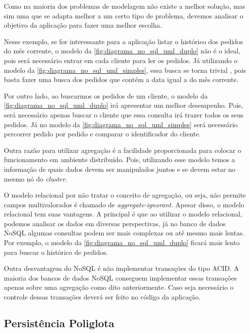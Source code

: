 Como na maioria dos problemas de modelagem não existe a melhor solução, mas sim uma que se adapta melhor a um certo tipo de problema, devemos analisar o objetivo da aplicação para fazer uma melhor escolha.

Nesse exemplo, se for interessante para a aplicação listar o histórico dos pedidos do mês corrente, o modelo da \autoref{fig:diagrama_no_sql_uml_duplo} não é o ideal, pois será necessário entrar em cada cliente para ler os pedidos. Já utilizando o modelo da \autoref{fig:diagrama_no_sql_uml_simples}, essa busca se torna trivial \cite{NoSQL}, pois basta fazer uma busca dos pedidos que contém a data igual a do mês corrente.

Por outro lado, ao buscarmos os pedidos de um cliente, o modelo da \autoref{fig:diagrama_no_sql_uml_duplo} irá apresentar um melhor desempenho. Pois, será necessário apenas buscar o cliente que essa consulta irá trazer todos os seus pedidos. Já no modelo da \autoref{fig:diagrama_no_sql_uml_simples} será necessário percorrer pedido por pedido e comparar o identificador do cliente.

Outra razão para utilizar agregação é a facilidade proporcionada para colocar o funcionamento em ambiente distribuído. Pois, utilizando esse modelo temos a informação de quais dados devem ser manipulados juntos e se devem estar no mesmo nó do \textit{cluster}.

O modelo relacional por não tratar o conceito de agregação, ou seja, não permite campos multivalorados é chamado de \textit{aggregate-ignorant}. Apesar disso, o modelo relacional tem suas vantagens. A principal é que ao utilizar o modelo relacional, podemos analisar os dados em diversas perspectivas, já no banco de dados NoSQL algumas consultas podem ser mais complexas ou até mesmo mais lentas. Por exemplo, o modelo da \autoref{fig:diagrama_no_sql_uml_duplo} ficará mais lento para buscar o histórico de pedidos.

Outra desvantagem do NoSQL é não implementar transações do tipo \ac{ACID}. A maioria dos bancos de dados NoSQL conseguem implementar essas transações apenas sobre uma agregação como dito anteriormente. Caso seja necessário o controle dessas transações deverá ser feito no código da aplicação.

\subsection{Persistência Poliglota}
\label{subsec:polyglotpersitence}


